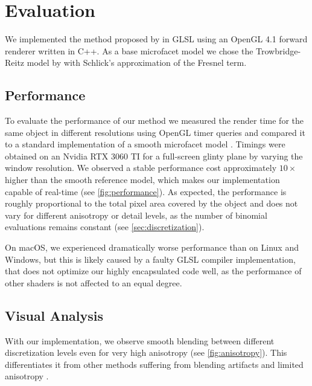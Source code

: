 \section{Evaluation}
\label{sec:evaluation}

We implemented the method proposed by \textcite{deliot2023} in GLSL using an OpenGL 4.1 forward renderer written in C++. As a base microfacet model we chose the Trowbridge-Reitz model by \textcite{trowbridge1975, walter2007} with Schlick's approximation of the Fresnel term.

\subsection{Performance}
\label{sec:performance}



To evaluate the performance of our method we measured the render time for the same object in different resolutions using OpenGL timer queries and compared it to a standard implementation of a smooth microfacet model \parencite{trowbridge1975,walter2007}.
%
Timings were obtained on an Nvidia RTX 3060 TI for a full-screen glinty plane by varying the window resolution.
%
We observed a stable performance cost approximately $10\times$ higher than 
the smooth reference model, which makes our implementation capable of real-time (see \cref{fig:performance}).
%
As expected, the performance is roughly proportional to the total pixel area covered by the object and does not vary for different anisotropy or detail levels, as the number of binomial evaluations remains constant (see \cref{sec:discretization}).

On macOS, we experienced dramatically worse performance than on Linux and Windows, but this is likely caused by a faulty GLSL compiler implementation, that does not optimize our highly encapsulated code well, as the performance of other shaders is not affected to an equal degree.


\subsection{Visual Analysis}
\label{sec:visual-analysis}



With our implementation, we observe smooth blending between different discretization levels even for very high anisotropy (see \cref{fig:anisotropy}).
%
This differentiates it from other methods suffering from blending artifacts and limited anisotropy \parencite{chermain2020a,zirr2016}.

